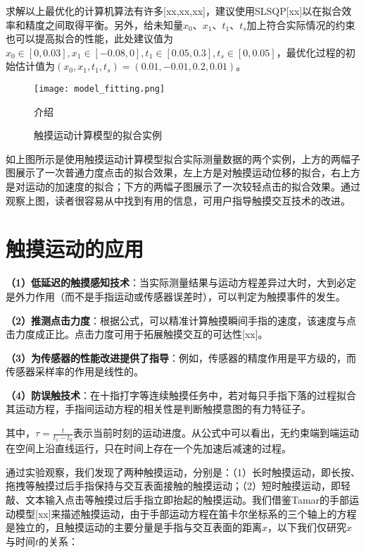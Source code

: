 求解以上最优化的计算机算法有许多[xx,xx,xx]，建议使用SLSQP[xx]以在拟合效率和精度之间取得平衡。另外，给未知量$x_0$、$x_1$、$t_1$、$t_s$加上符合实际情况的约束也可以提高拟合的性能，此处建议值为$x_0\in[0,0.03], x_1\in[-0.08,0], t_1\in[0.05,0.3], t_s\in[0,0.05]$，最优化过程的初始估计值为$(x_0,x_1,t_1,t_s)=(0.01,-0.01,0.2,0.01)$。

\begin{figure}
	\centering
	\texttt{[image: model\_fitting.png]}
	\caption*{介绍}
	\caption{触摸运动计算模型的拟合实例}
	\label{fig:model_fitting}
\end{figure}

如上图所示是使用触摸运动计算模型拟合实际测量数据的两个实例，上方的两幅子图展示了一次普通力度点击的拟合效果，左上方是对触摸运动位移的拟合，右上方是对运动的加速度的拟合；下方的两幅子图展示了一次较轻点击的拟合效果。通过观察上图，读者很容易从中找到有用的信息，可用户指导触摸交互技术的改进。

\section{触摸运动的应用}

\textbf{（1）低延迟的触摸感知技术}：当实际测量结果与运动方程差异过大时，大到必定是外力作用（而不是手指运动或传感器误差时），可以判定为触摸事件的发生。

\textbf{（2）推测点击力度}：根据公式，可以精准计算触摸瞬间手指的速度，该速度与点击力度成正比。点击力度可用于拓展触摸交互的可达性[xx]。

\textbf{（3）为传感器的性能改进提供了指导}：例如，传感器的精度作用是平方级的，而传感器采样率的作用是线性的。

\textbf{（4）防误触技术}：在十指打字等连续触摸任务中，若对每只手指下落的过程拟合其运动方程，手指间运动方程的相关性是判断触摸意图的有力特征子。







\iffalse

其中，$\tau=\frac{t}{t_1-t_0}$表示当前时刻的运动进度。从公式中可以看出，无约束端到端运动在空间上沿直线运行，只在时间上存在一个先加速后减速的过程。

通过实验观察，我们发现了两种触摸运动，分别是：（1）长时触摸运动，即长按、拖拽等触摸过后手指保持与交互表面接触的触摸运动；（2）短时触摸运动，即轻敲、文本输入点击等触摸过后手指立即抬起的触摸运动。我们借鉴Tamar的手部运动模型[xx]来描述触摸运动，由于手部运动方程在笛卡尔坐标系的三个轴上的方程是独立的，且触摸运动的主要分量是手指与交互表面的距离$x$，以下我们仅研究$x$与时间$t$的关系：


